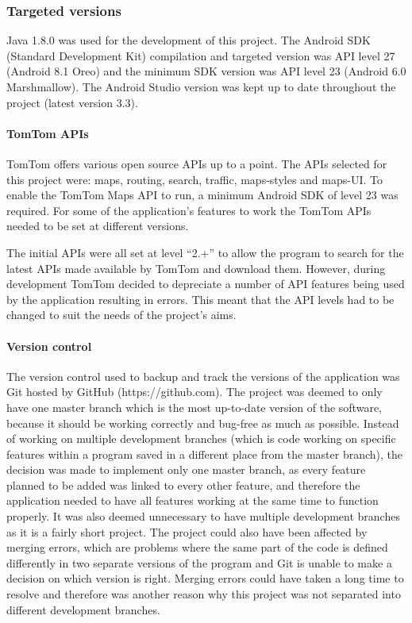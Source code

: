 \documentclass[12pt,a4paper]{article}
\begin{document}
\subsubsection{Targeted versions}
Java 1.8.0 was used for the development of this project. The Android SDK (Standard Development Kit) compilation and targeted version was API level 27 (Android 8.1 Oreo) and the minimum SDK version was API level 23 (Android 6.0 Marshmallow). The Android Studio version was kept up to date throughout the project (latest version 3.3). 

\paragraph{TomTom APIs}
TomTom offers various open source APIs up to a point. The APIs selected for this project were: maps, routing, search, traffic, maps-styles and maps-UI. To enable the TomTom Maps API to run, a minimum Android SDK of level 23 was required. For some of the application's features to work the TomTom APIs needed to be set at different versions.

 The initial APIs were all set at level \enquote{2.+} to allow the program to search for the latest APIs made available by TomTom and download them. However, during development TomTom decided to depreciate a number of API features being used by the application resulting in errors. This meant that the API levels had to be changed to suit the needs of the project's aims.   

\paragraph{Version control}
The version control used to backup and track the versions of the application was Git hosted by GitHub (https://github.com). The project was deemed to only have one master branch which is the most up-to-date version of the software, because it should be working correctly and bug-free as much as possible. Instead of working on multiple development branches (which is code working on specific features within a program saved in a different place from the master branch), the decision was made to implement only one master branch, as every feature planned to be added was linked to every other feature, and therefore the application needed to have all features working at the same time to function properly. It was also deemed unnecessary to have multiple development branches as it is a fairly short project. The project could also have been affected by merging errors, which are problems where the same part of the code is defined  differently in two separate versions of the program and Git is unable to make a decision on which version is right. Merging errors could have taken a long time to resolve and therefore was another reason why this project was not separated into different development branches.
\end{document}

